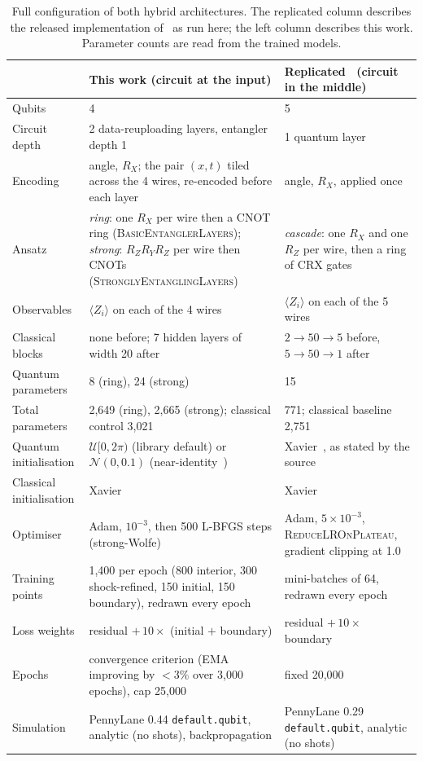 \documentclass[conference,a4paper]{IEEEtran}
\begin{document}
\begin{table}[t]
\caption{Full configuration of both hybrid architectures. The replicated column
describes the released implementation of~\cite{qcpinn} as run here; the left column
describes this work. Parameter counts are read from the trained models.}
\label{tab:config}
\centering
\scriptsize
\begin{tabular}{p{}p{}p{}}
\hline
& \textbf{This work (circuit at the input)} & \textbf{Replicated~\cite{qcpinn} (circuit in the middle)} \\
\hline
Qubits & 4 & 5 \\
Circuit depth & 2 data-reuploading layers, entangler depth 1 & 1 quantum layer \\
Encoding & angle, $R_X$; the pair $(x,t)$ tiled across the 4 wires, re-encoded before each layer & angle, $R_X$, applied once \\
Ansatz & \emph{ring}: one $R_X$ per wire then a CNOT ring (\textsc{BasicEntanglerLayers}); \emph{strong}: $R_ZR_YR_Z$ per wire then CNOTs (\textsc{StronglyEntanglingLayers}) & \emph{cascade}: one $R_X$ and one $R_Z$ per wire, then a ring of CRX gates \\
Observables & $\langle Z_i\rangle$ on each of the 4 wires & $\langle Z_i\rangle$ on each of the 5 wires \\
Classical blocks & none before; 7 hidden layers of width 20 after & $2\!\to\!50\!\to\!5$ before, $5\!\to\!50\!\to\!1$ after \\
Quantum parameters & 8 (ring), 24 (strong) & 15 \\
Total parameters & 2{,}649 (ring), 2{,}665 (strong); classical control 3{,}021 & 771; classical baseline 2{,}751 \\
Quantum initialisation & $\mathcal{U}[0,2\pi)$ (library default) or $\mathcal{N}(0,0.1)$ (near-identity~\cite{grant}) & Xavier~\cite{glorot}, as stated by the source \\
Classical initialisation & Xavier~\cite{glorot} & Xavier~\cite{glorot} \\
Optimiser & Adam, $10^{-3}$, then 500 L-BFGS steps (strong-Wolfe) & Adam, $5\times10^{-3}$, \textsc{ReduceLROnPlateau}, gradient clipping at 1.0 \\
Training points & 1{,}400 per epoch (800 interior, 300 shock-refined, 150 initial, 150 boundary), redrawn every epoch & mini-batches of 64, redrawn every epoch \\
Loss weights & residual $+\,10\times$ (initial $+$ boundary) & residual $+\,10\times$ boundary \\
Epochs & convergence criterion (EMA improving by $<3\%$ over 3{,}000 epochs), cap 25{,}000 & fixed 20{,}000 \\
Simulation & PennyLane 0.44 \texttt{default.qubit}, analytic (no shots), backpropagation & PennyLane 0.29 \texttt{default.qubit}, analytic (no shots) \\
\hline
\end{tabular}
\end{table}
\end{document}
